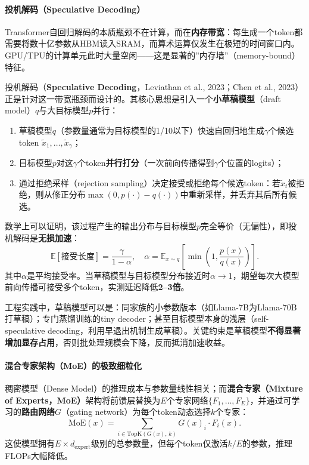 \documentclass[12pt,a4paper]{article}
\begin{document}
\paragraph{投机解码（Speculative Decoding）}

Transformer自回归解码的本质瓶颈不在计算，而在\textbf{内存带宽}：每生成一个token都需要将数十亿参数从HBM读入SRAM，而算术运算仅发生在极短的时间窗口内。GPU/TPU的计算单元此时大量空闲——这是显著的”内存墙”（memory-bound）特征。

投机解码（\textbf{Speculative Decoding}，Leviathan et al., 2023；Chen et al., 2023）正是针对这一带宽瓶颈而设计的。其核心思想是引入一个\textbf{小草稿模型}（draft model）$q$与大目标模型$p$并行：
\begin{enumerate}
    \item 草稿模型$q$（参数量通常为目标模型的1/10以下）快速自回归地生成$\gamma$个候选token $\tilde{x}_1,\ldots,\tilde{x}_\gamma$；
    \item 目标模型$p$对这$\gamma$个token\textbf{并行打分}（一次前向传播得到$\gamma$个位置的logits）；
    \item 通过拒绝采样（rejection sampling）决定接受或拒绝每个候选token：若$\tilde{x}_t$被拒绝，则从修正分布$\max(0, p(\cdot)-q(\cdot))$中重新采样，并丢弃其后所有候选。
\end{enumerate}

数学上可以证明，该过程产生的输出分布与目标模型$p$完全等价（无偏性），即投机解码是\textbf{无损加速}：
\begin{equation}
\mathbb{E}[\text{接受长度}] = \frac{\gamma}{1 - \alpha},\quad \alpha = \mathbb{E}_{x\sim q}\left[\min\!\left(1,\frac{p(x)}{q(x)}\right)\right].
\end{equation}
其中$\alpha$是平均接受率。当草稿模型与目标模型分布接近时$\alpha\to 1$，期望每次大模型前向传播可接受多个token，实测延迟降低\textbf{2--3倍}。

工程实践中，草稿模型可以是：同家族的小参数版本（如Llama-7B为Llama-70B打草稿）；专门蒸馏训练的tiny decoder；甚至目标模型本身的浅层（self-speculative decoding，利用早退出机制生成草稿）。关键约束是草稿模型\textbf{不得显著增加显存占用}，否则批处理规模会下降，反而抵消加速收益。

\paragraph{混合专家架构（MoE）的极致细粒化}

稠密模型（Dense Model）的推理成本与参数量线性相关；而\textbf{混合专家（Mixture of Experts，MoE）}架构将前馈层替换为$E$个专家网络$\{F_1,\ldots,F_E\}$，并通过可学习的\textbf{路由网络}$G$（gating network）为每个token动态选择$k$个专家：
\begin{equation}
\text{MoE}(x) = \sum_{i \in \text{TopK}(G(x),\, k)} G(x)_i \cdot F_i(x).
\end{equation}
这使模型拥有$E \times d_{\text{expert}}$级别的总参数量，但每个token仅激活$k/E$的参数，推理FLOPs大幅降低。
\end{document}
